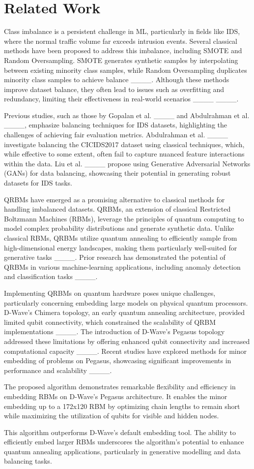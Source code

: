 \section{Related Work}
\label{sec:related}
Class imbalance is a persistent challenge in ML, particularly in fields like IDS, where the normal traffic volume far exceeds intrusion events. Several classical methods have been proposed to address this imbalance, including SMOTE and Random Oversampling. SMOTE generates synthetic samples by interpolating between existing minority class samples, while Random Oversampling duplicates minority class samples to achieve balance ____. Although these methods improve dataset balance, they often lead to issues such as overfitting and redundancy, limiting their effectiveness in real-world scenarios ____ ____.

Previous studies, such as those by Gopalan et al. ____ and Abdulrahman et al. ____, emphasize balancing techniques for IDS datasets, highlighting the challenges of achieving fair evaluation metrics. Abdulrahman et al. ____ investigate balancing the CICIDS2017 dataset using classical techniques, which, while effective to some extent, often fail to capture nuanced feature interactions within the data. Liu et al. ____ propose using Generative Adversarial Networks (GANs) for data balancing, showcasing their potential in generating robust datasets for IDS tasks. 

QRBMs have emerged as a promising alternative to classical methods for handling imbalanced datasets. QRBMs, an extension of classical Restricted Boltzmann Machines (RBMs), leverage the principles of quantum computing to model complex probability distributions and generate synthetic data. Unlike classical RBMs, QRBMs utilize quantum annealing to efficiently sample from high-dimensional energy landscapes, making them particularly well-suited for generative tasks ____. Prior research has demonstrated the potential of QRBMs in various machine-learning applications, including anomaly detection and classification tasks  ____.

Implementing QRBMs on quantum hardware poses unique challenges, particularly concerning embedding large models on physical quantum processors. D-Wave’s Chimera topology, an early quantum annealing architecture, provided limited qubit connectivity, which constrained the scalability of QRBM implementations ____. The introduction of D-Wave’s Pegasus topology addressed these limitations by offering enhanced qubit connectivity and increased computational capacity ____. Recent studies have explored methods for minor embedding of problems on Pegasus, showcasing significant improvements in performance and scalability ____.

The proposed algorithm demonstrates remarkable flexibility and efficiency in embedding RBMs on D-Wave's Pegasus architecture. It enables the minor embedding up to a 172x120 RBM by optimizing chain lengths to remain short while maximizing the utilization of qubits for visible and hidden nodes.

This algorithm outperforms D-Wave’s default embedding tool. The ability to efficiently embed larger RBMs underscores the algorithm’s potential to enhance quantum annealing applications, particularly in generative modelling and data balancing tasks.
